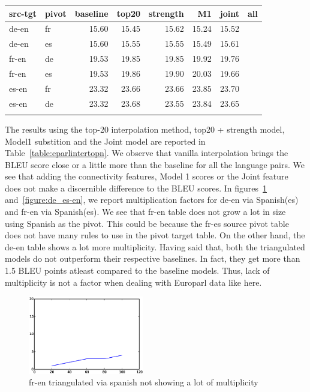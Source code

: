 	\begin{tabular}{llrrrrrr}
	\toprule
	src-tgt & pivot & baseline & top20 & strength & M1 & joint & all \\
	\toprule
	de-en & fr & 15.60 & 15.45 & 15.62 & 15.24 & 15.52 \\
	de-en & es & 15.60 & 15.55 & 15.55 & 15.49 & 15.61  \\
	fr-en & de & 19.53 & 19.85 & 19.85 & 19.92 & 19.76  \\
	fr-en & es & 19.53 & 19.86 & 19.90 & 20.03 & 19.66  \\
	es-en & fr & 23.32 & 23.66 & 23.66 & 23.85 & 23.70  \\
	es-en & de & 23.32 & 23.68 & 23.55 & 23.84 & 23.65  \\
	\bottomrule
	\centering
	\small
	\label{table:eparlintertopn}
	\end{tabular}

	The results using the top-20 interpolation method, top20 + strength model, Model1 substition and the Joint model are reported in Table~\ref{table:eparlintertopn}. We observe that vanilla interpolation brings the BLEU score close or a little more than the baseline for all the language pairs. We see that adding the connectivity features, Model 1 scores or the Joint feature does not make a discernible difference to the BLEU scores. In figures~\ref{figure:fr_es_en} and~\ref{figure:de_es-en}, we report multiplication factors for de-en via Spanish(es) and fr-en via Spanish(es). We see that fr-en table does not grow a lot in size using Spanish as the pivot. This could be because the fr-es source pivot table does not have many rules to use in the pivot target table. On the other hand, the de-en table shows a lot more multiplicity. Having said that, both the triangulated models do not outperform their respective baselines. In fact, they get more than 1.5 BLEU points atleast compared to the baseline models. Thus, lack of multiplicity is not a factor when dealing with Europarl data like here. 
 
	\begin{figure}
		\small
		\centering
		\includegraphics[width=0.45\textwidth]{files/Tables/fr_es_en.eps}
		\caption{fr-en triangulated via spanish not showing  a lot of multiplicity}
		\label{figure:fr_es_en}
	\end{figure}

